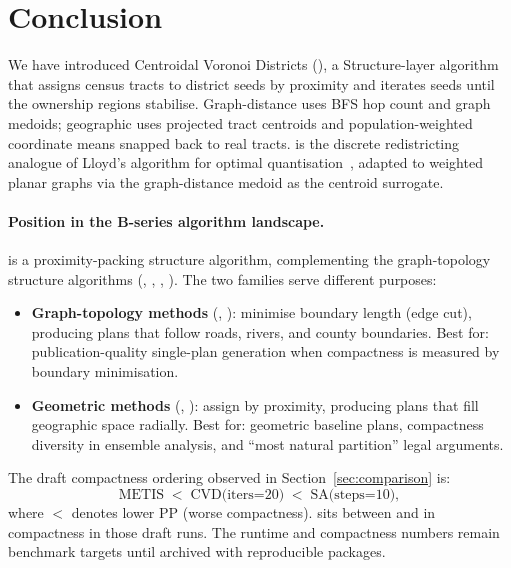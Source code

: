 \section{Conclusion}
\label{sec:conclusion}

We have introduced Centroidal Voronoi Districts (\cvd{}), a Structure-layer
algorithm that assigns census tracts to district seeds by proximity and
iterates seeds until the ownership regions stabilise.
Graph-distance \cvd{} uses BFS hop count and graph medoids; geographic
\cvd{} uses projected tract centroids and population-weighted coordinate means
snapped back to real tracts.
\cvd{} is the discrete redistricting analogue of Lloyd's algorithm for
optimal quantisation~\citep{lloyd1982,du1999}, adapted to weighted planar
graphs via the graph-distance medoid as the centroid surrogate.

\paragraph{Position in the B-series algorithm landscape.}
\cvd{} is a proximity-packing structure algorithm, complementing the graph-topology
structure algorithms (\metis{}, \sa{}, \geosec{}, \areasec{}).
The two families serve different purposes:
\begin{itemize}
\item \textbf{Graph-topology methods} (\metis{}, \sa{}): minimise boundary
  length (edge cut), producing plans that follow roads, rivers, and county
  boundaries.
  Best for: publication-quality single-plan generation when compactness is
  measured by boundary minimisation.
\item \textbf{Geometric methods} (\cvd{}, \bfsgrowth{}): assign by proximity,
  producing plans that fill geographic space radially.
  Best for: geometric baseline plans, compactness diversity in ensemble
  analysis, and ``most natural partition'' legal arguments.
\end{itemize}

The draft compactness ordering observed in Section~\ref{sec:comparison} is:
\[
  \text{METIS} \;<\; \text{CVD(iters=20)} \;<\; \text{SA(steps=10)},
\]
where $<$ denotes lower PP (worse compactness).
\cvd{} sits between \metis{} and \sa{} in compactness in those draft runs.
The runtime and compactness numbers remain benchmark targets until archived
with reproducible packages.

